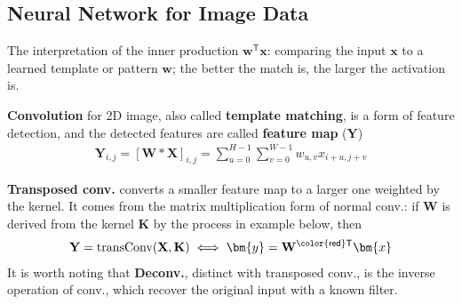 

\subsection{Neural Network for Image Data}

The interpretation of the inner production $\bm{w}^\mathsf{T}\bm{x}$: 
comparing the input $\bm{x}$ to a learned template or pattern $\bm{w}$;
the better the match is, the larger the activation is. 

\textbf{Convolution} for 2D image, also called \textbf{template matching}, is a form of feature detection, 
and the detected features are called \textbf{feature map} ($\mathbf{Y}$)
\begin{align}
    \mathbf{Y}_{i,j}
    = [\mathbf{W}*\mathbf{X}]_{i,j}
    = \sum_{u=0}^{H-1}\sum_{v=0}^{W-1}w_{u,v}x_{i+u,j+v}
\end{align}

\textbf{Transposed conv.} converts a smaller feature map to a larger one weighted by the kernel.
It comes from the matrix multiplication form of normal conv.:
if $\mathbf{W}$ is derived from the kernel $\mathbf{K}$ by the process in example below,
then 
\begin{gather}
    \mathbf{Y}=\text{transConv}(\mathbf{X},\mathbf{K})\iff\bm{y}=\mathbf{W}^\mathsf{{\color{red}T}}\bm{x}
\end{gather}
It is worth noting that \textbf{Deconv.}, distinct with transposed conv., is the inverse operation of conv., 
which recover the original input with a known filter.



